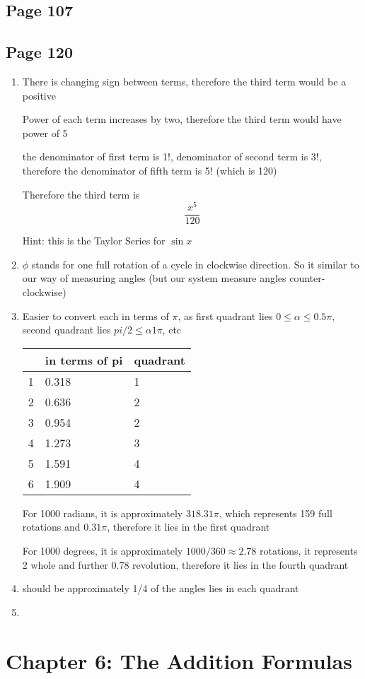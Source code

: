 \documentclass{article}
\newenvironment{solutions}[1]
{\subsection*{#1}
 \begin{enumerate}[leftmargin=1.5em]}
{\end{enumerate}}
\newcommand{\solution}{\item}
\begin{document}
\begin{solutions}{Page 107}
\begin{solutions}{Page 120}
\solution
There is changing sign between terms, therefore the third term would be a positive

Power of each term increases by two, therefore the third term would have power of 5

the denominator of first term is 1!, denominator of second term is 3!, therefore the denominator of fifth term is 5! (which is 120)

Therefore the third term is \[\frac{x^5}{120} \]

Hint: this is the Taylor Series for $\sin x$

\solution
$\phi$ stands for one full rotation of a cycle in clockwise direction. So it similar to our way of measuring angles (but our system measure angles counter-clockwise)

\solution
Easier to convert each in terms of $\pi$, as first quadrant lies $0 \leq \alpha \leq 0.5\pi$, second quadrant lies $pi/2 \leq \alpha 1\pi$, etc

\begin{tabular}{|l|l|l|}
\hline
      & in terms of pi    & quadrant \\ \hline
1     & 0.318 & 1        \\ \hline
2     & 0.636 & 2        \\ \hline
3     & 0.954 & 2        \\ \hline
4     & 1.273 & 3        \\ \hline
5     & 1.591 & 4        \\ \hline
6     & 1.909 & 4        \\ \hline
\end{tabular}
For 1000 radians, it is approximately $318.31\pi$, which represents 159 full rotations and $0.31\pi$, therefore it lies in the first quadrant

For 1000 degrees, it is approximately $1000/360 \approx 2.78$ rotations, it represents 2 whole and further 0.78 revolution, therefore it lies in the fourth quadrant

\solution
should be approximately 1/4 of the angles lies in each quadrant

\solution

\end{solutions}
\end{solutions}


\section*{Chapter 6: The Addition Formulas}
\end{document}
